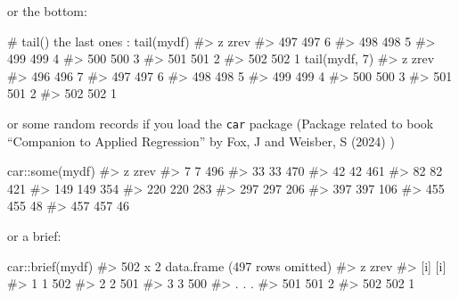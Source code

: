 \documentclass[
  letterpaper,
  DIV=11,
  numbers=noendperiod]{scrreprt}
\newenvironment{Shaded}{\begin{snugshade}}{\end{snugshade}}
\newcommand{\CommentTok}[1]{\textcolor[rgb]{0.37,0.37,0.37}{#1}}
\newcommand{\DecValTok}[1]{\textcolor[rgb]{0.68,0.00,0.00}{#1}}
\newcommand{\FunctionTok}[1]{\textcolor[rgb]{0.28,0.35,0.67}{#1}}
\newcommand{\NormalTok}[1]{\textcolor[rgb]{0.00,0.23,0.31}{#1}}
\newcommand{\SpecialCharTok}[1]{\textcolor[rgb]{0.37,0.37,0.37}{#1}}
\begin{document}
or the bottom:

\begin{Shaded}
\begin{Highlighting}[]
\CommentTok{\# tail() the last ones :}
\FunctionTok{tail}\NormalTok{(mydf)}
\CommentTok{\#\textgreater{}       z zrev}
\CommentTok{\#\textgreater{} 497 497    6}
\CommentTok{\#\textgreater{} 498 498    5}
\CommentTok{\#\textgreater{} 499 499    4}
\CommentTok{\#\textgreater{} 500 500    3}
\CommentTok{\#\textgreater{} 501 501    2}
\CommentTok{\#\textgreater{} 502 502    1}
\FunctionTok{tail}\NormalTok{(mydf, }\DecValTok{7}\NormalTok{)}
\CommentTok{\#\textgreater{}       z zrev}
\CommentTok{\#\textgreater{} 496 496    7}
\CommentTok{\#\textgreater{} 497 497    6}
\CommentTok{\#\textgreater{} 498 498    5}
\CommentTok{\#\textgreater{} 499 499    4}
\CommentTok{\#\textgreater{} 500 500    3}
\CommentTok{\#\textgreater{} 501 501    2}
\CommentTok{\#\textgreater{} 502 502    1}
\end{Highlighting}
\end{Shaded}

or some random records if you load the \texttt{car} package (Package
related to book ``Companion to Applied Regression'' by Fox, J and
Weisber, S (2024) )

\begin{Shaded}
\begin{Highlighting}[]
\NormalTok{car}\SpecialCharTok{::}\FunctionTok{some}\NormalTok{(mydf)}
\CommentTok{\#\textgreater{}       z zrev}
\CommentTok{\#\textgreater{} 7     7  496}
\CommentTok{\#\textgreater{} 33   33  470}
\CommentTok{\#\textgreater{} 42   42  461}
\CommentTok{\#\textgreater{} 82   82  421}
\CommentTok{\#\textgreater{} 149 149  354}
\CommentTok{\#\textgreater{} 220 220  283}
\CommentTok{\#\textgreater{} 297 297  206}
\CommentTok{\#\textgreater{} 397 397  106}
\CommentTok{\#\textgreater{} 455 455   48}
\CommentTok{\#\textgreater{} 457 457   46}
\end{Highlighting}
\end{Shaded}

or a brief:

\begin{Shaded}
\begin{Highlighting}[]
\NormalTok{car}\SpecialCharTok{::}\FunctionTok{brief}\NormalTok{(mydf)}
\CommentTok{\#\textgreater{} 502 x 2 data.frame (497 rows omitted)}
\CommentTok{\#\textgreater{}       z zrev}
\CommentTok{\#\textgreater{}     [i]  [i]}
\CommentTok{\#\textgreater{} 1     1  502}
\CommentTok{\#\textgreater{} 2     2  501}
\CommentTok{\#\textgreater{} 3     3  500}
\CommentTok{\#\textgreater{} . . .            }
\CommentTok{\#\textgreater{} 501 501    2}
\CommentTok{\#\textgreater{} 502 502    1}
\end{Highlighting}
\end{Shaded}
\end{document}
